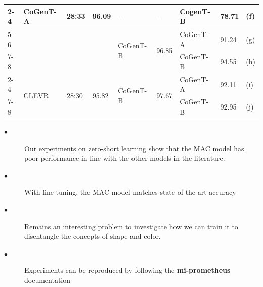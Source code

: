 \documentclass[final,paperwidth=36in,paperheight=48in,portrait,fontscale=0.36]{baposter}
\begin{document}
\begin{poster}
{\begin{table}[H]
{\begin{tabular}{lllllllll}
		\cmidrule{2-4} \cmidrule{5-6} \cmidrule{7-8} 
		& \multirow{4}{*}{CoGenT-A}   & \multirow{4}{*}{28:33}   & \multirow{4}{*}{96.09}  &  \multirow{1}{*}{--}  &  \multirow{1}{*}{--}   & CogenT-B & 78.71        & (f)  \\
		\cmidrule{5-6} \cmidrule{7-8} 
		&                             &                                         &    &   \multirow{2}{*}{CoGenT-B}         &       \multirow{2}{*}{96.85}          & CoGenT-A &  91.24        & (g) \\
		\cmidrule{7-8} 
		&                             &                                         &       &         &                & CoGenT-B &    94.55     & (h)  \\
		
		\cmidrule{2-4} \cmidrule{5-6} \cmidrule{7-8} 
		& \multirow{2}{*}{CLEVR}  & \multirow{2}{*}{28:30}  & \multirow{2}{*}{95.82} &   \multirow{2}{*}{CoGenT-B}         &       \multirow{2}{*}{97.67}          & CoGenT-A &  92.11       & (i) \\
		\cmidrule{7-8} 
		&                             &                                         &       &         &                & CoGenT-B &    92.95    & (j)  \\  		
		
		
		\bottomrule
		
	
	\end{tabular}}
	\label{tab:data_properties}
\end{table}


\begin{description}
	\item[$\bullet$] Our experiments on zero-short learning show that the MAC model has poor performance in line with
	the other models in the literature.
	\item[$\bullet$] With fine-tuning, the MAC model matches state of
	the art accuracy
	\item[$\bullet$]Remains an interesting problem to investigate how we can train it to disentangle the concepts of shape and color.
	\item[$\bullet$] Experiments can be reproduced by following the \textbf{mi-prometheus}  documentation
\end{description}

}



\end{poster}
\end{document}
